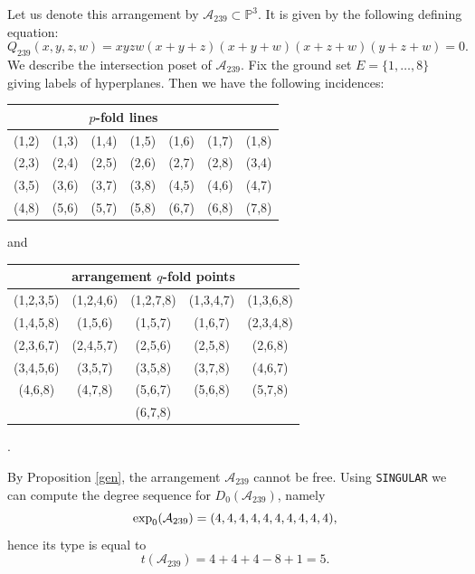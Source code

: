 \documentclass[11pt]{article}
\theoremstyle{plain}
\theoremstyle{definition}
\begin{document}
\noindent
{}
\vskip 5pt
\noindent
Let us denote this arrangement by $\mathcal{A}_{239} \subset \mathbb{P}^{3}$. It is given by the following defining equation:
$$Q_{239}(x,y,z,w) = xyzw(x+y+z)(x+y+w)(x+z+w)(y+z+w)=0.$$
We describe the intersection poset of $\mathcal{A}_{239}$. Fix the ground set $E= \{1, \ldots , 8\}$ giving labels of hyperplanes. Then we have the following incidences:
\begin{center}
\begin{tabular}{ c c c c c c c }
\multicolumn{6}{c}{$p$-fold lines} \\\hline \hline
 (1,2) &  (1,3) &  (1,4) &  (1,5) &  (1,6) & 
 (1,7) &  (1,8) \\
 (2,3) &  (2,4) &  (2,5) &  (2,6) &  (2,7) & 
 (2,8) &  (3,4)\\  
 (3,5) & (3,6) &  (3,7) &  
 (3,8) &  (4,5) &  (4,6) &  (4,7)\\  (4,8) &
 (5,6) &  (5,7) &  (5,8) &  (6,7) &  (6,8) & 
 (7,8)
\end{tabular}
\end{center}
and 
\begin{center}
\begin{tabular}{ c c c c c }
\multicolumn{5}{c}{arrangement $q$-fold points} \\ \hline \hline 
(1,2,3,5) &  (1,2,4,6) & (1,2,7,8) &  (1,3,4,7) &  (1,3,6,8)\\
(1,4,5,8) &  (1,5,6) & (1,5,7) & (1,6,7) &  (2,3,4,8)\\
(2,3,6,7) & (2,4,5,7) & (2,5,6) & (2,5,8) &  (2,6,8)\\
(3,4,5,6) & (3,5,7) & (3,5,8) & (3,7,8) &  (4,6,7)\\
(4,6,8) &  (4,7,8) & (5,6,7) & (5,6,8) &  (5,7,8)\\
& & (6,7,8) & &
\end{tabular}.
\end{center}
By Proposition \ref{gen}, the arrangement $\mathcal{A}_{239}$ cannot be free. Using \texttt{SINGULAR} we can compute the degree sequence for $D_{0}(\mathcal{A}_{239})$, namely
$${\rm exp}_{0}(\mathcal{A}_{239}) = (4,4,4,4,4,4,4,4,4,4),$$
hence its type is equal to
$$t(\mathcal{A}_{239})= 4+4+4-8+1 = 5.$$

\end{document}
